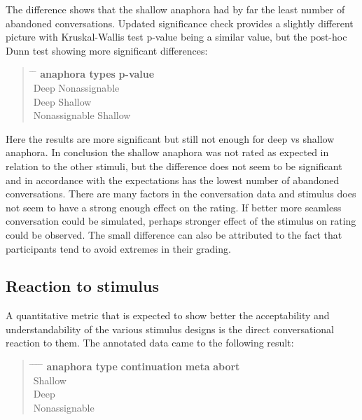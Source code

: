 The difference shows that the shallow anaphora had by far the least number of abandoned conversations.
Updated significance check provides a slightly different picture with
Kruskal-Wallis test p-value being a similar value, but
the post-hoc Dunn test showing more significant differences:

\begin{quote}
\begin{tabbing}
\hspace{4cm} \= \hspace{4cm} \= \kill %
\textbf{anaphora types} \> \> \textbf{p-value} \\
Deep \> Nonassignable  \\
Deep \> Shallow  \\
Nonassignable \> Shallow  \\
\end{tabbing}
\end{quote}

Here the results are more significant but still not enough for deep vs shallow anaphora.
In conclusion the shallow anaphora was not rated as expected in relation to the other stimuli, but
the difference does not seem to be significant and
in accordance with the expectations has the lowest number of abandoned conversations.
There are many factors in the conversation data and
stimulus does not seem to have a strong enough effect on the rating.
If better more seamless conversation could be simulated,
perhaps stronger effect of the stimulus on rating could be observed.
The small difference can also be attributed to the fact that participants tend to
avoid extremes in their grading.

\subsection{Reaction to stimulus}

A quantitative metric that is expected to show better the acceptability and understandability
of the various stimulus designs is the direct conversational reaction to them.
The annotated data came to the following result:

\begin{quote}
\begin{tabbing}
\hspace{4cm} \= \hspace{3cm} \= \hspace{3cm} \= \hspace{3cm} \= \kill %
\textbf{anaphora type} \> \textbf{continuation} \> \textbf{meta} \> \textbf{abort} \\
Shallow            \\
Deep               \\
Nonassignable      \\
\end{tabbing}
\end{quote}

